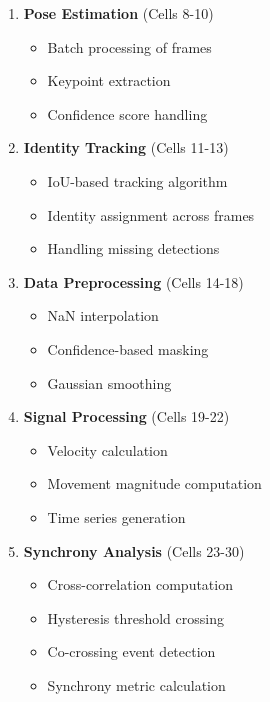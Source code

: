 \documentclass[11pt]{article}
\begin{document}
\begin{enumerate}
    \item \textbf{Pose Estimation} (Cells 8-10)
    \begin{itemize}
        \item Batch processing of frames
        \item Keypoint extraction
        \item Confidence score handling
    \end{itemize}
    
    \item \textbf{Identity Tracking} (Cells 11-13)
    \begin{itemize}
        \item IoU-based tracking algorithm
        \item Identity assignment across frames
        \item Handling missing detections
    \end{itemize}
    
    \item \textbf{Data Preprocessing} (Cells 14-18)
    \begin{itemize}
        \item NaN interpolation
        \item Confidence-based masking
        \item Gaussian smoothing
    \end{itemize}
    
    \item \textbf{Signal Processing} (Cells 19-22)
    \begin{itemize}
        \item Velocity calculation
        \item Movement magnitude computation
        \item Time series generation
    \end{itemize}
    
    \item \textbf{Synchrony Analysis} (Cells 23-30)
    \begin{itemize}
        \item Cross-correlation computation
        \item Hysteresis threshold crossing
        \item Co-crossing event detection
        \item Synchrony metric calculation
    \end{itemize}
\end{enumerate}
\end{document}
